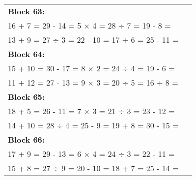 \documentclass[a4paper,12pt]{scrartcl}
\begin{document}
\begin{adjustbox}{center, valign=c}
\begin{tabular}{@{}p{0.95\linewidth}@{}}
\textbf{Block 63:}\\
16 + 7 = \hfill 29 - 14 = \hfill 5 × 4 = \hfill 28 ÷ 7 = \hfill 19 - 8 =\\
13 + 9 = \hfill 27 ÷ 3 = \hfill 22 - 10 = \hfill 17 + 6 = \hfill 25 - 11 =\\[0.6em]

\textbf{Block 64:}\\
15 + 10 = \hfill 30 - 17 = \hfill 8 × 2 = \hfill 24 ÷ 4 = \hfill 19 - 6 =\\
11 + 12 = \hfill 27 - 13 = \hfill 9 × 3 = \hfill 20 ÷ 5 = \hfill 16 + 8 =\\[0.6em]

\textbf{Block 65:}\\
18 + 5 = \hfill 26 - 11 = \hfill 7 × 3 = \hfill 21 ÷ 3 = \hfill 23 - 12 =\\
14 + 10 = \hfill 28 ÷ 4 = \hfill 25 - 9 = \hfill 19 + 8 = \hfill 30 - 15 =\\[0.6em]

\textbf{Block 66:}\\
17 + 9 = \hfill 29 - 13 = \hfill 6 × 4 = \hfill 24 ÷ 3 = \hfill 22 - 11 =\\
15 + 8 = \hfill 27 ÷ 9 = \hfill 20 - 10 = \hfill 18 + 7 = \hfill 25 - 14 =\\[0.6em]

\end{tabular}
\end{adjustbox}
\end{document}
